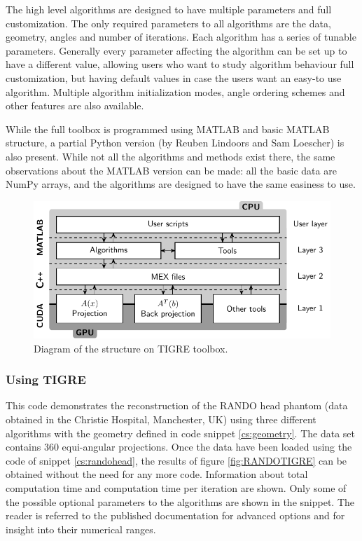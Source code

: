 The high level algorithms are designed to have multiple parameters and full customization. The only required parameters to all algorithms are the data, geometry, angles and number of iterations. Each algorithm has a series of tunable parameters. Generally every parameter affecting the algorithm can be set up to have a different value, allowing users who want to study algorithm behaviour full customization, but having default values in case the users want an easy-to use algorithm. Multiple algorithm initialization modes, angle ordering schemes and other features are also available. 

While the full toolbox is programmed using MATLAB and basic MATLAB structure, a partial Python version (by Reuben Lindoors and Sam Loescher) is also present. While not all the algorithms and methods exist there, the same observations about the MATLAB version can be made: all the basic data are NumPy arrays, and the algorithms are designed to have the same easiness to use.

\begin{figure}
\begin{center}

\includegraphics{GPUmethods/structureTIGRE-figure0.pdf} 
\end{center}

\caption[Diagram of the structure of the TIGRE toolbox]{\label{fig:structureTIGRE} Diagram of the structure on TIGRE toolbox.} 
\end{figure}

\subsubsection{Using TIGRE}
This code demonstrates the reconstruction of the RANDO head phantom (data obtained in the Christie Hospital, Manchester, UK) using three different algorithms with the geometry defined in code snippet \ref{cs:geometry}. The data set contains 360 equi-angular projections. Once the data have been loaded using the code of snippet \ref{cs:randohead}, the results of figure \ref{fig:RANDOTIGRE} can be obtained without the need for any more code. Information about total computation time and computation time per iteration are shown. Only some of the possible optional parameters to the algorithms are shown in the snippet. The reader is referred to the published documentation for advanced options and for insight into their numerical ranges. 

